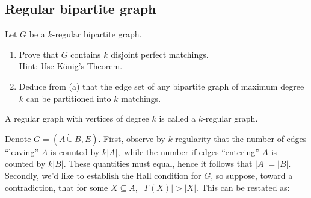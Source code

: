 \documentclass{article}
\begin{document}
  \subsection{Regular bipartite graph}
  \begin{centerframebox}
    Let $G$ be a $k$-regular bipartite graph.

    \begin{enumerate}[label=(\alph*)]
      \item
      Prove that $G$ contains $k$ disjoint perfect matchings. \\
      Hint: Use König's Theorem.

      \item
      Deduce from (a) that the edge set of any bipartite graph of maximum degree
      $k$ can be partitioned into $k$ matchings.
    \end{enumerate}

    A regular graph with vertices of degree $k$ is called a $k$‑regular graph.
  \end{centerframebox}


Denote $G=(A\dot\cup B, E)$. First, observe by $k$-regularity that the number of edges ``leaving'' $A$ is counted by $k|A|,$ while the number if edges ``entering'' $A$ is counted by $k|B|.$ These quantities must equal, hence it follows that $|A|=|B|.$ Secondly, we'd like to establish the Hall condition for $G$, so suppose, toward a contradiction, that for some $X\subseteq A,$ $|\Gamma(X)|> |X|.$ This can be restated as:
\end{document}
